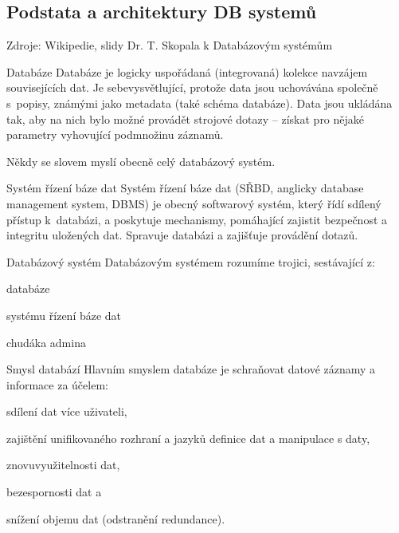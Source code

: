 \subsection{Podstata a architektury DB systemů}

Zdroje: Wikipedie, slidy Dr. T. Skopala k Databázovým systémům
\bigskip

\begin{definiceN}{Databáze}
Databáze je logicky uspořádaná (integrovaná) kolekce navzájem souvisejících dat. Je sebevysvětlující, protože data jsou uchovávána společně s popisy, známými jako metadata (také schéma databáze). Data jsou ukládána tak, aby na nich bylo možné provádět strojové dotazy -- získat pro nějaké parametry vyhovující podmnožinu záznamů.

Někdy se slovem  myslí obecně celý databázový systém.
\end{definiceN}

\begin{definiceN}{Systém řízení báze dat}
Systém řízení báze dat (SŘBD, anglicky database management system, DBMS) je obecný softwarový systém, který řídí sdílený přístup k databázi, a poskytuje mechanismy, pomáhající zajistit bezpečnost a integritu uložených dat. Spravuje databázi a zajišťuje provádění dotazů.
\end{definiceN}

\begin{definiceN}{Databázový systém}
Databázovým systémem rozumíme trojici, sestávající z:
\begin{pitemize}
    \item databáze
    \item systému řízení báze dat
    \item chudáka admina
\end{pitemize}
\end{definiceN}

\begin{obecne}{Smysl databází}
Hlavním smyslem databáze je schraňovat datové záznamy a informace za účelem:
\begin{pitemize}
    \item sdílení dat více uživateli,
    \item zajištění unifikovaného rozhraní a jazyků definice dat a manipulace s daty,
    \item znovuvyužitelnosti dat,
    \item bezespornosti dat a
    \item snížení objemu dat (odstranění redundance).
\end{pitemize}
\end{obecne}

